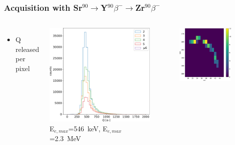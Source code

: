     \begin{frame}
        \frametitle{Acquisition with Sr$^{90}$$\rightarrow$Y$^{90}$$\beta^-$$\rightarrow$Zr$^{90}$$\beta^-$}
        \begin{columns}
                \begin{itemize}
                    \item Q released per pixel
                \end{itemize}
                \bigskip
                \includegraphics[width=1.1\linewidth]{figures/charaterization/Sr90_spectrum_per_pixel.pdf} 
            E$_{e, max}$=\SI{546}{keV}, E$_{e, max}$=\SI{2.3}{MeV}
                \begin{figure}
                    \includegraphics[width=.3\linewidth]{figures/charaterization/evts/Sr90/18b.png}

\end{figure}
\end{columns}
\end{frame}
